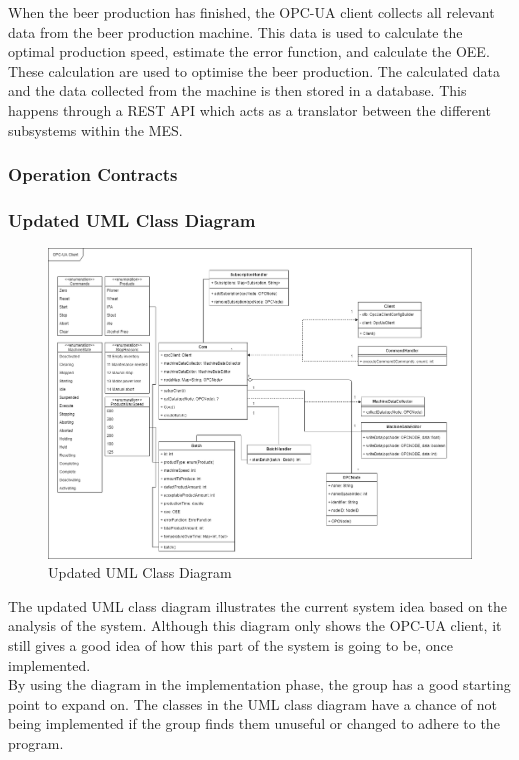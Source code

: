 When the beer production has finished, the OPC-UA client collects all relevant
data from the beer production machine. This data is used to calculate the
optimal production speed, estimate the error function, and calculate the OEE.
These calculation are used to optimise the beer production. The calculated data
and the data collected from the machine is then stored in a database. This
happens through a REST API which acts as a translator between the different 
subsystems within the MES.

\subsubsection{Operation Contracts}

\subsubsection{Updated UML Class Diagram}
\begin{figure}[ht]
\centering 
\includegraphics[scale=0.3]{images/diagrams/updated_UML_Class_Diagram.drawio.png}
\caption{Updated UML Class Diagram}
\label{figure:updated_UML_class_diagram} 
\end{figure}


The updated UML class diagram illustrates the current system idea based on the 
analysis of the system. Although this diagram only shows the 
OPC-UA client, it still gives a good idea of how this part of the system is going
to be, once implemented. \\

By using the diagram in the implementation phase, the group has a good starting 
point to expand on. The classes in the UML class diagram have a chance of not 
being implemented if the group finds them unuseful or changed to adhere to the 
program.